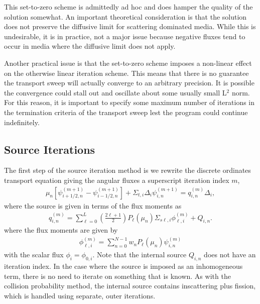 This set-to-zero scheme is admittedly ad hoc and does hamper the quality of the solution somewhat. An important theoretical consideration is that the solution does not preserve the diffusive limit for scattering dominated media. While this is undesirable, it is in practice, not a major issue because negative fluxes tend to occur in media where the diffusive limit does not apply.

Another practical issue is that the set-to-zero scheme imposes a non-linear effect on the otherwise linear iteration scheme. This means that there is no guarantee the transport sweep will actually converge to an arbitrary precision. It is possible the convergence could stall out and oscillate about some usually small L$^2$ norm. For this reason, it is important to specify some maximum number of iterations in the termination criteria of the transport sweep lest the program could continue indefinitely.


\subsection{Source Iterations}

The first step of the source iteration method is we rewrite the discrete ordinates transport equation giving the angular fluxes a superscript iteration index $m$, 
\begin{align}
  \mu_n \left[ \psi_{i+1/2,n}^{(m+1)} - \psi_{i-1/2,n}^{(m+1)} \right] + \Sigma_{t,i} \Delta_i \psi_{i,n}^{(m+1)} = q_{i,n}^{(m)} \Delta_i , \label{Eq:neutronics_discreteOrdinatesTransportEquation_Iteration}
\end{align}
where the source is given in terms of the flux moments as
\begin{align}
  q_{i,n}^{(m)} = \sum_{\ell=0}^L \left( \frac{2\ell+1}{2} \right) P_\ell(\mu_n) \Sigma_{s\ell,i} \phi_{\ell,i}^{(m)}  + Q_{i,n}.
\end{align}
where the flux moments are given by
\begin{align}
  \phi_{\ell,i}^{(m)} = \sum_{n=0}^{N-1} w_n P_\ell (\mu_n) \psi_{i,n}^{(m)} 
\end{align}
with the scalar flux $\phi_i = \phi_{0,i}$. Note that the internal source $Q_{i,n}$ does not have an iteration index. In the case where the source is imposed as an inhomogeneous term, there is no need to iterate on something that is known. As with the collision probability method, the internal source contains inscattering plus fission, which is handled using separate, outer iterations.

